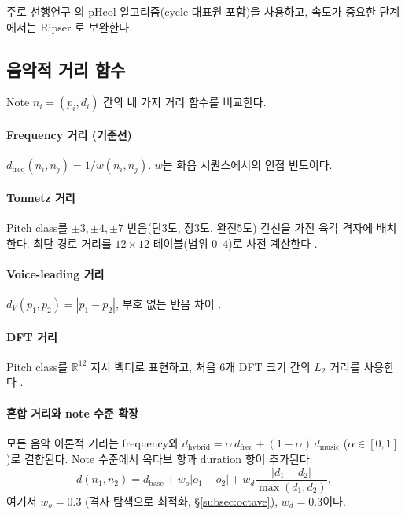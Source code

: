 \documentclass[11pt,a4paper]{article}
\begin{document}
주로 선행연구 \cite{tran2021,lee2024}의 pHcol 알고리즘(cycle 대표원
포함)을 사용하고, 속도가 중요한 단계에서는 Ripser \cite{bauer2021}로
보완한다.

\subsection{음악적 거리 함수}
\label{subsec:distances}

Note $n_i = (p_i, d_i)$ 간의 네 가지 거리 함수를 비교한다.

\paragraph{Frequency 거리 (기준선)}
$d_{\mathrm{freq}}(n_i, n_j) = 1/w(n_i, n_j)$. $w$는 화음 시퀀스에서의
인접 빈도이다.

\paragraph{Tonnetz 거리}
Pitch class를 $\pm 3, \pm 4, \pm 7$ 반음(단3도, 장3도, 완전5도)
간선을 가진 육각 격자에 배치한다.
최단 경로 거리를 $12 \times 12$ 테이블(범위 $0$--$4$)로 사전
계산한다 \cite{tymoczko2012}.

\paragraph{Voice-leading 거리}
$d_V(p_1, p_2) = |p_1 - p_2|$, 부호 없는 반음 차이
\cite{tymoczko2008}.

\paragraph{DFT 거리}
Pitch class를 $\mathbb{R}^{12}$ 지시 벡터로 표현하고,
처음 6개 DFT 크기 간의 $L_2$ 거리를 사용한다 \cite{tymoczko2008}.

\paragraph{혼합 거리와 note 수준 확장}
모든 음악 이론적 거리는 frequency와
$d_{\mathrm{hybrid}} = \alpha\, d_{\mathrm{freq}} + (1-\alpha)\, d_{\mathrm{music}}$
($\alpha \in [0,1]$)로 결합된다. Note 수준에서 옥타브 항과
duration 항이 추가된다:
\begin{equation}
d(n_1, n_2) = d_{\mathrm{base}} + w_o |o_1 - o_2| + w_d \frac{|d_1 - d_2|}{\max(d_1, d_2)},
\end{equation}
여기서 $w_o = 0.3$ (격자 탐색으로 최적화, \S\ref{subsec:octave}),
$w_d = 0.3$이다.
\end{document}
